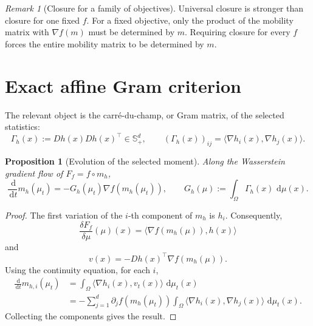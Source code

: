 \documentclass[11pt]{article}
\newcommand{\Sym}{\mathbb S}
\newcommand{\dd}{\,\mathrm d}
\newtheorem{proposition}{Proposition}
\theoremstyle{remark}
\newtheorem{remark}{Remark}
\begin{document}
\begin{remark}[Closure for a family of objectives]
Universal closure is stronger than closure for one fixed \(f\).  For a
fixed objective, only the product of the mobility matrix with
\(\nabla f(m)\) must be determined by \(m\).  Requiring closure for every
\(f\) forces the entire mobility matrix to be determined by \(m\).
\end{remark}

\section{Exact affine Gram criterion}

The relevant object is the carré-du-champ, or Gram matrix, of the selected
statistics:
\[
  \Gamma_h(x):=Dh(x)Dh(x)^\top\in\Sym^d_+,
  \qquad
  (\Gamma_h(x))_{ij}
  =
  \langle\nabla h_i(x),\nabla h_j(x)\rangle.
\]

\begin{proposition}[Evolution of the selected moment]
\label{prop:moment-evolution}
Along the Wasserstein gradient flow of \(F_f=f\circ m_h\),
\[
  \frac{\dd}{\dd t}m_h(\mu_t)
  =
  -G_h(\mu_t)\nabla f(m_h(\mu_t)),
  \qquad
  G_h(\mu):=\int_\Omega\Gamma_h(x)\,\dd\mu(x).
\]
\end{proposition}

\begin{proof}
The first variation of the \(i\)-th component of \(m_h\) is \(h_i\).
Consequently,
\[
  \frac{\delta F_f}{\delta\mu}(\mu)(x)
  =
  \langle\nabla f(m_h(\mu)),h(x)\rangle
\]
and
\[
  v(x)=-Dh(x)^\top\nabla f(m_h(\mu)).
\]
Using the continuity equation, for each \(i\),
\[
  \begin{aligned}
  \frac{\dd}{\dd t}m_{h,i}(\mu_t)
  &=
  \int_\Omega\langle\nabla h_i(x),v_t(x)\rangle\,\dd\mu_t(x)\\
  &=
  -\sum_{j=1}^d
  \partial_j f(m_h(\mu_t))
  \int_\Omega
  \langle\nabla h_i(x),\nabla h_j(x)\rangle\,\dd\mu_t(x).
  \end{aligned}
\]
Collecting the components gives the result.
\end{proof}
\end{document}
